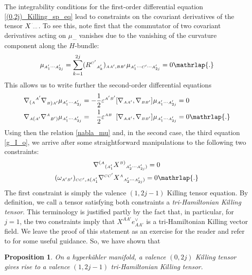 \documentclass[11pt]{amsart}
\newtheorem{proposition}[theorem]{Proposition}
\theoremstyle{remark}
\theoremstyle{remark}
\theoremstyle{definition}
\theoremstyle{definition}
\theoremstyle{definition}
\newcommand{\0}{{\scriptstyle 0'}} %
\newcommand{\1}{{\scriptstyle 1'}}
\newcommand{\A}{{\scriptscriptstyle A}} %
\newcommand{\B}{{\scriptscriptstyle B}}
\newcommand{\C}{{\scriptscriptstyle C}}
\newcommand{\pt}{\hspace{1pt}} %
\newcommand{\hp}{\hspace{0.5pt}} %
\begin{document}
The integrability conditions for the first-order differential equation \eqref{(0,2j)_Killing_sp_eq} lead to constraints on the covariant derivatives of the tensor $X^{\hp ^{.}}{}_{\!\cdots}$. To see this, note first that the commutator of two covariant derivatives acting on $\mu_{\pt \cdots}$ vanishes due to the vanishing of the curvature component along the $H$-bundle:
\begin{equation}
[\nabla_{\A\A'},\nabla_{\B\B'}] \hp \mu_{\A'_1\cdots\A'_{2j}} = \sum_{k=1}^{2j} (R^{\C'}{}_{\A'_k})_{\A\A',\B\B'} \hp \mu_{\A'_1\cdots\C'\cdots\A'_{2j}} = 0 \mathrlap{.}
\end{equation}
This allows us to write further the second-order differential equations
\begin{equation}
\begin{aligned}
\nabla_{(\A}{}^{\A'} \nabla_{\B)\A'}^{\phantom{CC}} \mu_{\A'_1\cdots\A'_{2j}} & = - \frac{1}{2}\varepsilon^{\A'\B'} [\nabla_{\A\A'}, \nabla_{\B\B'}] \hp \mu_{\A'_1\cdots\A'_{2j}} = 0 \\[0pt]
\nabla_{\A(\A'} \nabla^{\A}{}_{\B')} \mu_{\A'_1\cdots\A'_{2j}} & = \phantom{+} \frac{1}{2} \varepsilon^{\A\B} \hspace{5.5pt} [\nabla_{\A\A'}, \nabla_{\B\B'}] \hp \mu_{\A'_1\cdots\A'_{2j}} = 0 \mathrlap{.}
\end{aligned}
\end{equation}
Using then the relation \eqref{nabla_mu} and, in the second case, the third equation \eqref{g_I_o}, we arrive after some straightforward manipulations to the following two constraints:
\begin{gather}
\nabla^{(\A}{}_{(\A'_1} X^{\B)}{}_{\A'_2 \cdots \A'_{2j})} = 0 \\
(\omega_{\A'\B'})_{\C\C',\A(\A'_1} \nabla^{\C\C'} X^{\A}{}_{\A'_2 \cdots \A'_{2j})} = 0 \mathrlap{.}
\end{gather}
The first constraint is simply the valence $(1,2j-1)$ Killing tensor equation. By definition, we call a tensor satisfying both constraints a \textit{tri-Hamiltonian Killing tensor}. This terminology is justified partly by the fact that, in particular, for $j=1$, the two constraints imply that $X^{\A\A'} e^{\vee}_{\A\A'}$ is a tri-Hamiltonian Killing vector field. We leave the proof of this statement as an exercise for the reader and refer to \cite{MR551471} for some useful guidance. So, we have shown that

\begin{proposition} \label{higher_K_tens}
On a hyperk\"ahler manifold, a valence $(0,2j)$ Killing tensor gives rise to a valence $(1,2j-1)$ tri-Ha\-mil\-to\-ni\-an Killing tensor.
\end{proposition}
\end{document}
